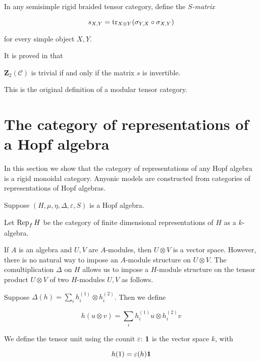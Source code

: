 In any semisimple rigid braided tensor category, define the \emph{$S$-matrix} 

\begin{equation}
\label{equation:s-matrix}
    s_{X,Y} = \operatorname{tr}_{X \otimes Y}(\sigma_{Y,X} \circ \sigma_{X,Y})
\end{equation}

for every simple object $X,Y$.

It is proved in \cite{mueger2001} that
\begin{theorem}
    $\mathbf{Z}_2(\mathcal{C})$ is trivial if and only if the matrix $s$ is invertible. 
\end{theorem}

This is the original definition of a modular tensor category.

\section{The category of representations of a Hopf algebra}
\label{section:RepHopfAlgebra}

In this section we show that the category of representations of any Hopf
algebra is a rigid monoidal category. Anyonic models are constructed from
categories of representations of Hopf algebras.

Suppose $(H, \mu, \eta, \Delta, \varepsilon, S)$ is a Hopf algebra.

Let $\operatorname{Rep}_f H$ be the category of finite dimensional representations of $H$ as
a $k$-algebra.

If $A$ is an algebra and $U, V$ are $A$-modules, then $U \otimes V$ is a vector
space. However, there is no natural way to impose an $A$-module structure on $U
\otimes V$.  The comultiplication $\Delta$ on $H$ allows us to impose a
$H$-module structure on the tensor product $U \otimes V$ of two $H$-modules
$U,V$ as follows.

Suppose $\Delta(h) = \sum _{i} h^{(1)}_i \otimes h^{(2)}_i$. Then we define

\begin{equation}
    h (u \otimes v) = \sum_{i} h^{(1)}_i u \otimes h^{(2)}_i v
\end{equation}

We define the tensor unit using the counit $\varepsilon$: $\mathbf{1}$ is the
vector space $k$, with 

\begin{equation}
    h(1) = \varepsilon(h) \mathbf{1} 
\end{equation}

